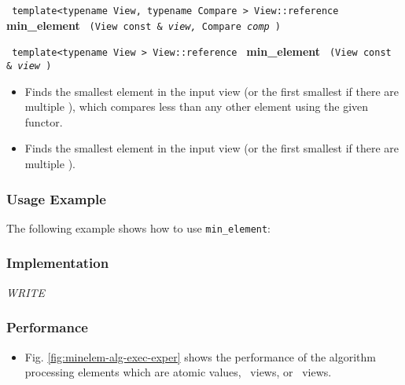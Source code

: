 \noindent
\texttt{%
template<typename View, typename Compare >
\newline
View::reference 
}
\newline
\textbf{min\_element}%
\texttt{%
(View const \&
\textit{view,}%
Compare 
\textit{comp}%
)
}
\vspace{0.4cm}

\noindent
\texttt{%
template<typename View >
\newline
View::reference 
}
\newline
\textbf{min\_element}%
\texttt{%
(View const \&
\textit{view}%
)
}

\begin{itemize}
\item
Finds the smallest element in the input view (or the first smallest if there are multiple
), which compares less than any other element using the given functor. 
\item
Finds the smallest element in the input view (or the first smallest if there are multiple
). 
\end{itemize}

\subsubsection{Usage Example} %

The following example shows how to use \texttt{min\_element}:

 
\subsubsection{Implementation} %

\textit{WRITE}

\subsubsection{Performance} %

\begin{itemize}
\item
Fig. \ref{fig:minelem-alg-exec-exper}
shows the performance of the algorithm processing
elements which are atomic values, \stl\ views, or \stapl\ views.
\end{itemize}

